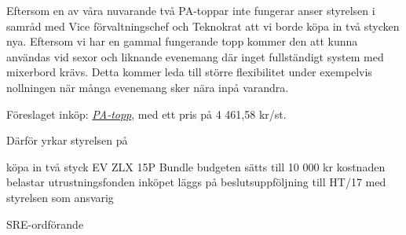 \documentclass[../_main/handlingar.tex]{subfiles}
\begin{document}

Eftersom en av våra nuvarande två PA-toppar inte fungerar anser styrelsen i samråd med Vice förvaltningschef och Teknokrat att vi borde köpa in två stycken nya. Eftersom vi har en gammal fungerande topp kommer den att kunna användas vid sexor och liknande evenemang där inget fullständigt system med mixerbord krävs. Detta kommer leda till större flexibilitet under exempelvis nollningen när många evenemang sker nära inpå varandra.

Föreslaget inköp: \href{https://www.thomann.de/se/ev_zlx_15p_bundle_2.htm?ref=search_rslt_EV+ZLX+15P_340452_2}{\textit{PA-topp}}, med ett pris på 4 461,58 kr/st.


Därför yrkar styrelsen på

\begin{attsatser}
    \att köpa in två styck EV ZLX 15P Bundle
    \att budgeten sätts till 10 000 kr
    \att kostnaden belastar utrustningsfonden
    \att inköpet läggs på beslutsuppföljning till HT/17 med styrelsen som ansvarig

\end{attsatser}

\begin{signatures}{1}
    \ist
    \signature{\sreordf}{SRE-ordförande}
\end{signatures}
\end{document}
